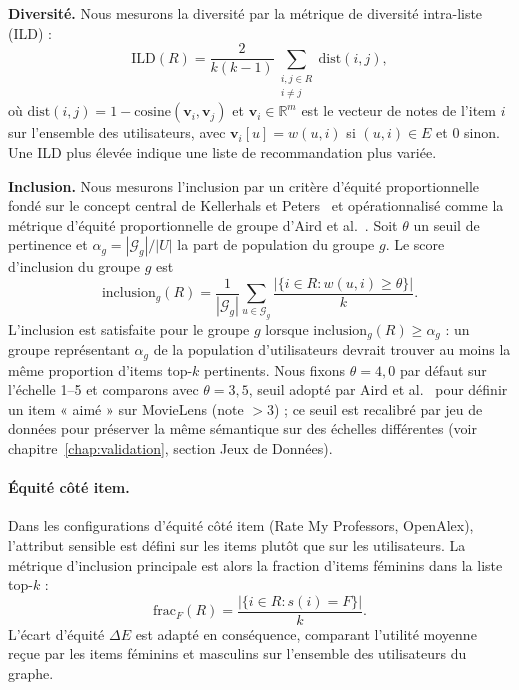 \documentclass[12pt]{report}
\begin{document}
\smallskip\noindent\textbf{Diversité.}
Nous mesurons la diversité par la métrique de diversité intra-liste
(ILD) :
\begin{equation}
  \mathrm{ILD}(R) = \frac{2}{k(k-1)}
    \sum_{\substack{i,j \in R \\ i \neq j}} \mathrm{dist}(i,j),
\end{equation}
où $\mathrm{dist}(i,j) = 1 - \mathrm{cosine}(\mathbf{v}_i, \mathbf{v}_j)$
et $\mathbf{v}_i \in \mathbb{R}^m$ est le vecteur de notes de l'item $i$
sur l'ensemble des utilisateurs, avec $\mathbf{v}_i[u] = w(u,i)$ si
$(u,i)\in E$ et $0$ sinon. Une ILD plus élevée indique une liste de
recommandation plus variée.

\smallskip\noindent\textbf{Inclusion.}
Nous mesurons l'inclusion par un critère d'équité proportionnelle fondé
sur le concept central de Kellerhals et
Peters~\cite{kellerhals_proportional_2024} et opérationnalisé comme la
métrique d'équité proportionnelle de groupe d'Aird et
al.~\cite{aird_social_2024}. Soit $\theta$ un seuil de pertinence et
$\alpha_g = |\mathcal{G}_g|/|U|$ la part de population du groupe $g$. Le
score d'inclusion du groupe $g$ est
\begin{equation}
  \mathrm{inclusion}_g(R)
    = \frac{1}{|\mathcal{G}_g|}
      \sum_{u \in \mathcal{G}_g}
      \frac{|\{i \in R : w(u,i) \geq \theta\}|}{k}.
\end{equation}
L'inclusion est satisfaite pour le groupe $g$ lorsque
$\mathrm{inclusion}_g(R) \geq \alpha_g$ : un groupe représentant
$\alpha_g$ de la population d'utilisateurs devrait trouver au moins la
même proportion d'items top-$k$ pertinents. Nous fixons $\theta = 4{,}0$
par défaut sur l'échelle 1--5 et comparons avec $\theta = 3{,}5$, seuil
adopté par Aird et al.~\cite{aird_social_2024} pour définir un item
« aimé » sur MovieLens (note $>3$) ; ce seuil est recalibré par jeu de
données pour préserver la même sémantique sur des échelles différentes
(voir chapitre~\ref{chap:validation}, section Jeux de Données).

\paragraph{Équité côté item.}
Dans les configurations d'équité côté item (Rate My Professors,
OpenAlex), l'attribut sensible est défini sur les items plutôt que sur
les utilisateurs. La métrique d'inclusion principale est alors la
fraction d'items féminins dans la liste top-$k$ :
\[
  \mathrm{frac}_F(R) = \frac{|\{i \in R : s(i) = F\}|}{k}.
\]
L'écart d'équité $\Delta E$ est adapté en conséquence, comparant
l'utilité moyenne reçue par les items féminins et masculins sur
l'ensemble des utilisateurs du graphe.
\end{document}
